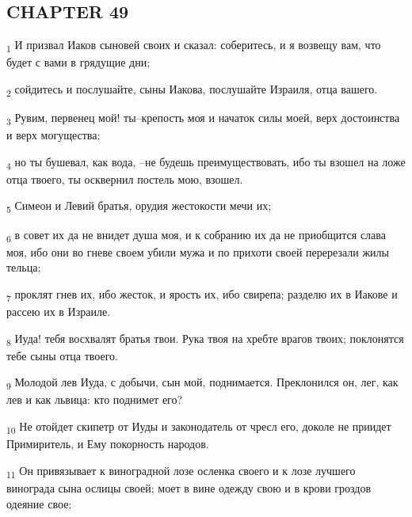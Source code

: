 \subsection{CHAPTER 49}
\begin{tcolorbox}
\textsubscript{1} И призвал Иаков сыновей своих и сказал: соберитесь, и я возвещу вам, что будет с вами в грядущие дни;
\end{tcolorbox}
\begin{tcolorbox}
\textsubscript{2} сойдитесь и послушайте, сыны Иакова, послушайте Израиля, отца вашего.
\end{tcolorbox}
\begin{tcolorbox}
\textsubscript{3} Рувим, первенец мой! ты--крепость моя и начаток силы моей, верх достоинства и верх могущества;
\end{tcolorbox}
\begin{tcolorbox}
\textsubscript{4} но ты бушевал, как вода, --не будешь преимуществовать, ибо ты взошел на ложе отца твоего, ты осквернил постель мою, взошел.
\end{tcolorbox}
\begin{tcolorbox}
\textsubscript{5} Симеон и Левий братья, орудия жестокости мечи их;
\end{tcolorbox}
\begin{tcolorbox}
\textsubscript{6} в совет их да не внидет душа моя, и к собранию их да не приобщится слава моя, ибо они во гневе своем убили мужа и по прихоти своей перерезали жилы тельца;
\end{tcolorbox}
\begin{tcolorbox}
\textsubscript{7} проклят гнев их, ибо жесток, и ярость их, ибо свирепа; разделю их в Иакове и рассею их в Израиле.
\end{tcolorbox}
\begin{tcolorbox}
\textsubscript{8} Иуда! тебя восхвалят братья твои. Рука твоя на хребте врагов твоих; поклонятся тебе сыны отца твоего.
\end{tcolorbox}
\begin{tcolorbox}
\textsubscript{9} Молодой лев Иуда, с добычи, сын мой, поднимается. Преклонился он, лег, как лев и как львица: кто поднимет его?
\end{tcolorbox}
\begin{tcolorbox}
\textsubscript{10} Не отойдет скипетр от Иуды и законодатель от чресл его, доколе не приидет Примиритель, и Ему покорность народов.
\end{tcolorbox}
\begin{tcolorbox}
\textsubscript{11} Он привязывает к виноградной лозе осленка своего и к лозе лучшего винограда сына ослицы своей; моет в вине одежду свою и в крови гроздов одеяние свое;
\end{tcolorbox}
